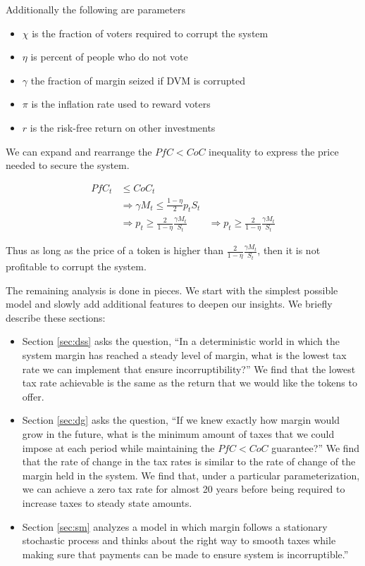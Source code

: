 \documentclass[12pt]{article}
\begin{document}
  Additionally the following are parameters

  \begin{itemize}
    \item $\chi$ is the fraction of voters required to corrupt the system
    \item $\eta$ is percent of people who do not vote
    \item $\gamma$ the fraction of margin seized if DVM is corrupted
    \item $\pi$ is the inflation rate used to reward voters
    \item $r$ is the risk-free return on other investments
  \end{itemize}

  We can expand and rearrange the $PfC < CoC$ inequality to express the price needed to secure the
  system.

  \begin{align*}
    PfC_t &\leq CoC_t \\
    &\Rightarrow \gamma M_t \leq \frac{1 - \eta}{2} p_t S_t \\
    &\Rightarrow p_t \geq \frac{2}{1 - \eta} \frac{\gamma M_t}{S_t}
    &\Rightarrow p_t \geq \frac{2}{1 - \eta} \frac{\gamma M_t}{S_t}
  \end{align*}

  Thus as long as the price of a token is higher than $\frac{2}{1 - \eta} \frac{\gamma M_t}{S_t}$,
  then it is not profitable to corrupt the system.

  The remaining analysis is done in pieces. We start with the simplest possible model and slowly
  add additional features to deepen our insights. We briefly describe these sections:

  \begin{itemize}
    \item Section \ref{sec:dss} asks the question, ``In a deterministic world in which the system
          margin has reached a steady level of margin, what is the lowest tax rate we can implement
          that ensure incorruptibility?'' We find that the lowest tax rate achievable is the same
          as the return that we would like the tokens to offer.
    \item Section \ref{sec:dg} asks the question, ``If we knew exactly how margin would grow
          in the future, what is the minimum amount of taxes that we could impose at each
          period while maintaining the $PfC < CoC$ guarantee?'' We find that the rate of change in
          the tax rates is similar to the rate of change of the margin held in the system. We find
          that, under a particular parameterization, we can achieve a zero tax rate for almost 20
          years before being required to increase taxes to steady state amounts.
    \item Section \ref{sec:sm} analyzes a model in which margin follows a stationary stochastic
          process and thinks about the right way to smooth taxes while making sure that payments
          can be made to ensure system is incorruptible.''
  \end{itemize}
\end{document}
